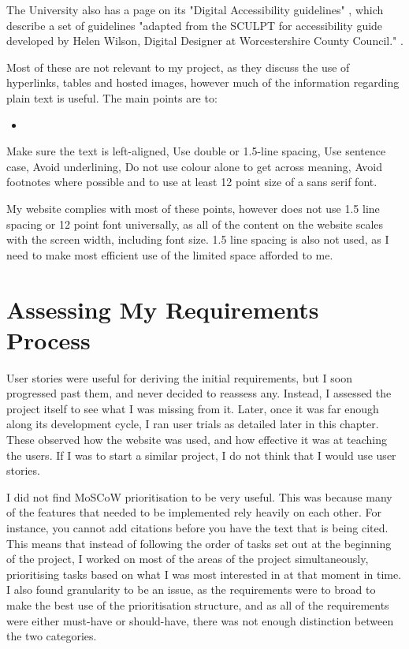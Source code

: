 \documentclass{l4proj}
\begin{document}
The University also has a page on its "Digital Accessibility guidelines" \citep{digital_accessibility}, which describe a set of guidelines "adapted from the SCULPT for accessibility guide developed by Helen Wilson, Digital Designer at Worcestershire County Council." \citep{sculpt}.

Most of these are not relevant to my project, as they discuss the use of hyperlinks, tables and hosted images, however much of the information regarding plain text is useful.  The main points are to: 

\begin{itemize}
    \item 
\end{itemize}
Make sure the text is left-aligned, Use double or 1.5-line spacing, Use sentence case, Avoid underlining, Do not use colour alone to get across meaning, Avoid footnotes where possible and to use at least 12 point size of a sans serif font.

My website complies with most of these points, however does not use 1.5 line spacing or 12 point font universally, as all of the content on the website scales with the screen width, including font size.  1.5 line spacing is also not used, as I need to make most efficient use of the limited space afforded to me.

\section{Assessing My Requirements Process}

User stories were useful for deriving the initial requirements, but I soon progressed past them, and never decided to reassess any.  Instead, I assessed the project itself to see what I was missing from it.  Later, once it was far enough along its development cycle, I ran user trials as detailed later in this chapter.  These observed how the website was used, and how effective it was at teaching the users.  If I was to start a similar project, I do not think that I would use user stories.

I did not find MoSCoW prioritisation to be very useful.  This was because many of the features that needed to be implemented rely heavily on each other.  For instance, you cannot add citations before you have the text that is being cited.  This means that instead of following the order of tasks set out at the beginning of the project, I worked on most of the areas of the project simultaneously, prioritising tasks based on what I was most interested in at that moment in time.  I also found granularity to be an issue, as the requirements were to broad to make the best use of the prioritisation structure, and as all of the requirements were either must-have or should-have, there was not enough distinction between the two categories.
\end{document}
